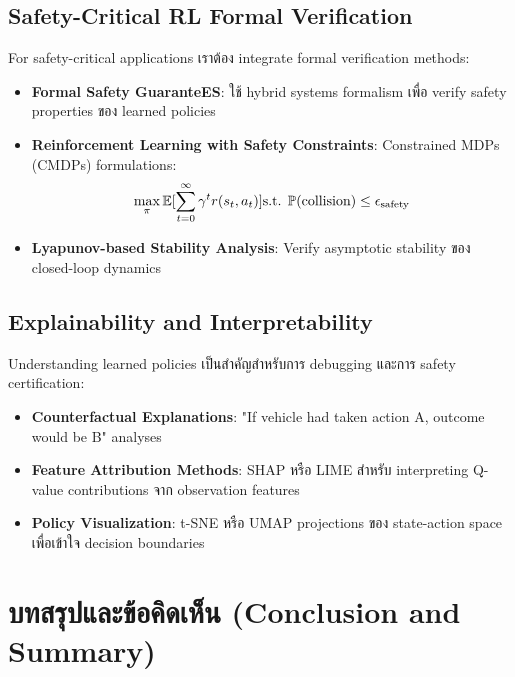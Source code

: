 \documentclass[10pt,a4paper,twocolumn]{article}
\begin{document}
\subsection{Safety-Critical RL Formal Verification}

For safety-critical applications เราต้อง integrate formal verification methods:
\begin{itemize}
    \item \textbf{Formal Safety GuaranteES}: ใช้ hybrid systems formalism เพื่อ verify safety properties ของ learned policies
    
    \item \textbf{Reinforcement Learning with Safety Constraints}: Constrained MDPs (CMDPs) formulations:
    \begin{equation}
        \max_\pi \mathbb{E}[\sum_{t=0}^\infty \gamma^t r(s_t,a_t)] \\
        \text{s.t. } \mathbb{P}(\text{collision}) \leq \epsilon_{\text{safety}}
    \end{equation}
    
    \item \textbf{Lyapunov-based Stability Analysis}: Verify asymptotic stability ของ closed-loop dynamics
\end{itemize}

\subsection{Explainability and Interpretability}

Understanding learned policies เป็นสำคัญสำหรับการ debugging และการ safety certification:
\begin{itemize}
    \item \textbf{Counterfactual Explanations}: "If vehicle had taken action A, outcome would be B" analyses
    
    \item \textbf{Feature Attribution Methods}: SHAP หรือ LIME สำหรับ interpreting Q-value contributions จาก observation features
    
    \item \textbf{Policy Visualization}: t-SNE หรือ UMAP projections ของ state-action space เพื่อเข้าใจ decision boundaries
\end{itemize}

\section*{บทสรุปและข้อคิดเห็น (Conclusion and Summary)}
\end{document}
